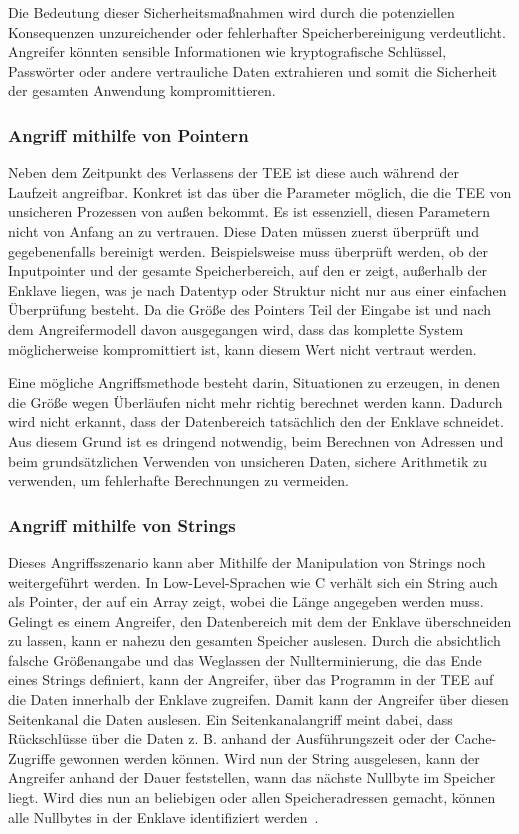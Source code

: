 Die Bedeutung dieser Sicherheitsmaßnahmen wird durch die potenziellen Konsequenzen unzureichender oder fehlerhafter Speicherbereinigung verdeutlicht. Angreifer könnten sensible Informationen wie kryptografische Schlüssel, Passwörter oder andere vertrauliche Daten extrahieren und somit die Sicherheit der gesamten Anwendung kompromittieren.

\subsubsection{Angriff mithilfe von Pointern}
Neben dem Zeitpunkt des Verlassens der TEE ist diese auch während der Laufzeit angreifbar. Konkret ist das über die Parameter möglich, die die TEE von unsicheren Prozessen von außen bekommt. Es ist essenziell, diesen Parametern nicht von Anfang an zu vertrauen. Diese Daten müssen zuerst überprüft und gegebenenfalls bereinigt werden.  Beispielsweise muss überprüft werden, ob der Inputpointer und der gesamte Speicherbereich, auf den er zeigt, außerhalb der Enklave liegen, was je nach Datentyp oder Struktur nicht nur aus einer einfachen Überprüfung besteht. Da die Größe des Pointers Teil der Eingabe ist und nach dem Angreifermodell davon ausgegangen wird, dass das komplette System möglicherweise kompromittiert ist, kann diesem Wert nicht vertraut werden.

Eine mögliche Angriffsmethode besteht darin, Situationen zu erzeugen, in denen die Größe wegen Überläufen nicht mehr richtig berechnet werden kann. Dadurch wird nicht erkannt, dass der Datenbereich tatsächlich den der Enklave schneidet. Aus diesem Grund ist es dringend notwendig, beim Berechnen von Adressen und beim grundsätzlichen Verwenden von unsicheren Daten, sichere Arithmetik zu verwenden, um fehlerhafte Berechnungen zu vermeiden.

\subsubsection{Angriff mithilfe von Strings}
Dieses Angriffsszenario kann aber Mithilfe der Manipulation von Strings noch weitergeführt werden. In Low-Level-Sprachen wie C verhält sich ein String auch als Pointer, der auf ein Array zeigt, wobei die Länge angegeben werden muss. 
Gelingt es einem Angreifer, den Datenbereich mit dem der Enklave überschneiden zu lassen, kann er nahezu den gesamten Speicher auslesen. Durch die absichtlich falsche Größenangabe und das Weglassen der Nullterminierung, die das Ende eines Strings definiert, kann der Angreifer, über das Programm in der TEE auf die Daten innerhalb der Enklave zugreifen. 
Damit kann der Angreifer über diesen Seitenkanal die Daten auslesen. 
Ein Seitenkanalangriff meint dabei, dass Rückschlüsse über die Daten z. B. anhand der Ausführungszeit oder der Cache-Zugriffe gewonnen werden können. Wird nun der String ausgelesen, kann der Angreifer anhand der Dauer feststellen, wann das nächste Nullbyte im Speicher liegt. 
Wird dies nun an beliebigen oder allen Speicheradressen gemacht, können alle Nullbytes in der Enklave identifiziert werden~\cite{TEEPaper}.

